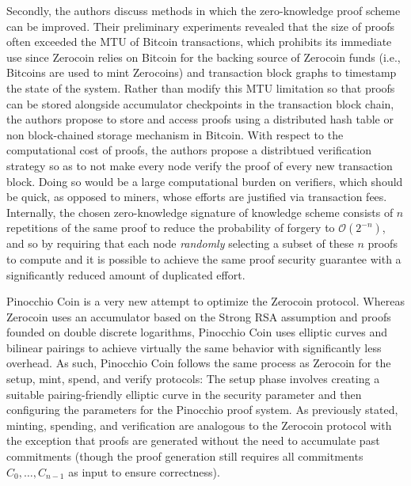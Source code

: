 Secondly, the authors discuss methods in which the zero-knowledge proof scheme can be improved. Their preliminary experiments revealed that the size of proofs often exceeded the MTU of Bitcoin transactions, which prohibits its immediate use since Zerocoin relies on Bitcoin for the backing source of Zerocoin funds (i.e., Bitcoins are used to mint Zerocoins) and transaction block graphs to timestamp the state of the system. Rather than modify this MTU limitation so that proofs can be stored alongside accumulator checkpoints in the transaction block chain, the authors propose to store and access proofs using a distributed hash table or non block-chained storage mechanism in Bitcoin. With respect to the computational cost of proofs, the authors propose a distribtued verification strategy so as to not make every node verify the proof of every new transaction block. Doing so would be a large computational burden on verifiers, which should be quick, as opposed to miners, whose efforts are justified via transaction fees. Internally, the chosen zero-knowledge signature of knowledge scheme consists of $n$ repetitions of the same proof to reduce the probability of forgery to $\mathcal{O}(2^{-n})$, and so by requiring that each node \emph{randomly} selecting a subset of these $n$ proofs to compute and it is possible to achieve the same proof security guarantee with a significantly reduced amount of duplicated effort.

Pinocchio Coin \cite{pinocchio} is a very new attempt to optimize the Zerocoin protocol. Whereas Zerocoin uses an accumulator based on the Strong RSA assumption and proofs founded on double discrete logarithms, Pinocchio Coin uses elliptic curves and bilinear pairings to achieve virtually the same behavior with significantly less overhead. As such, Pinocchio Coin follows the same process as Zerocoin for the setup, mint, spend, and verify protocols: The setup phase involves creating a suitable pairing-friendly elliptic curve in the security parameter and then configuring the parameters for the Pinocchio proof system. As previously stated, minting, spending, and verification are analogous to the Zerocoin protocol with the exception that proofs are generated without the need to accumulate past commitments (though the proof generation still requires all commitments $C_0,\dots,C_{n-1}$ as input to ensure correctness). 

